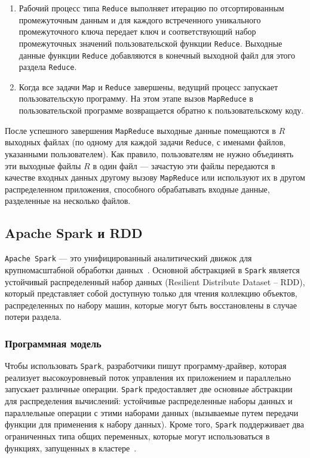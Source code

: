 \begin{enumerate}
  \item Рабочий процесс типа \texttt{Reduce} выполняет итерацию по отсортированным промежуточным данным и для каждого встреченного уникального промежуточного ключа передает ключ и соответствующий набор промежуточных значений пользовательской функции \texttt{Reduce}.
    Выходные данные функции \texttt{Reduce} добавляются в конечный выходной файл для этого раздела \texttt{Reduce}.
  \item Когда все задачи \texttt{Map} и \texttt{Reduce} завершены, ведущий процесс запускает пользовательскую программу. 
    На этом этапе вызов \texttt{MapReduce} в пользовательской программе возвращается обратно к пользовательскому коду.
\end{enumerate}

После успешного завершения \texttt{MapReduce} выходные данные помещаются в $R$ выходных файлах (по одному для каждой задачи \texttt{Reduce}, с именами файлов, указанными пользователем).
Как правило, пользователям не нужно объединять эти выходные файлы $R$ в один файл --- зачастую эти файлы передаются в качестве входных данных другому вызову \texttt{MapReduce} или используют их в другом распределенном приложения, способного обрабатывать входные данные, разделенные на несколько файлов.

\subsection{Apache Spark и RDD}

\texttt{Apache Spark} --- это унифицированный аналитический движок для крупномасштабной обработки данных~\cite{apache-spark}.
Основной абстракцией в \texttt{Spark} является устойчивый распределенный набор данных (Resilient Distribute Dataset -- RDD), который представляет собой доступную только для чтения коллекцию объектов, распределенных по набору машин, которые могут быть восстановлены в случае потери раздела.

\subsubsection{Программная модель}

Чтобы использовать \texttt{Spark}, разработчики пишут программу-драйвер, которая реализует высокоуровневый поток управления их приложением и параллельно запускает различные операции. 
\texttt{Spark} предоставляет две основные абстракции для распределения вычислений: устойчивые распределенные наборы данных и параллельные операции с этими наборами данных (вызываемые путем передачи функции для применения к набору данных).
Кроме того, \texttt{Spark} поддерживает два ограниченных типа общих переменных, которые могут использоваться в функциях, запущенных в кластере~\cite{180560}.

